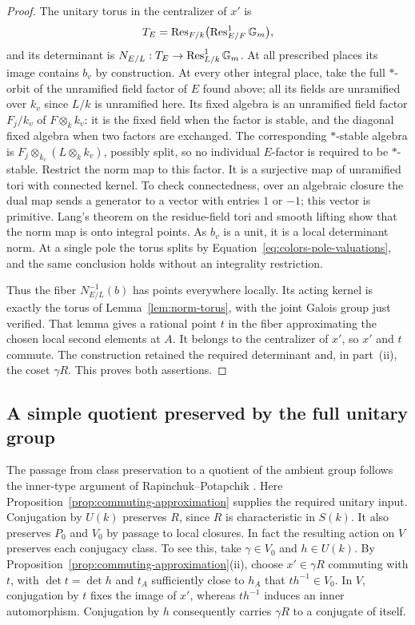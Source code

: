 \begin{proof}
The unitary torus in the centralizer of $x'$ is
\[
 T_E=\operatorname{Res}_{F/k}\bigl(\operatorname{Res}^1_{E/F}\mathbb G_m\bigr),
\]
and its determinant is $N_{E/L}:T_E\to\operatorname{Res}^1_{L/k}\mathbb G_m$.
At all prescribed places its image contains $b_v$ by construction.
At every other integral place, take the full $*$-orbit of the unramified
field factor of $E$ found above; all its fields are unramified over $k_v$
since $L/k$ is unramified here.  Its fixed algebra is an unramified field
factor $F_j/k_v$ of $F\otimes_k k_v$: it is the fixed field when the
factor is stable, and the diagonal fixed algebra when two factors are
exchanged.  The corresponding $*$-stable algebra is
$F_j\otimes_{k_v}(L\otimes_k k_v)$, possibly split, so no individual
$E$-factor is required to be $*$-stable.  Restrict the norm
map to this factor.  It is a surjective map of unramified tori with
connected kernel.  To check connectedness, over an algebraic closure
the dual map sends a generator to a vector with entries $1$ or $-1$;
this vector is primitive.  Lang's theorem on the residue-field tori and
smooth lifting show that the norm map is onto integral points.  As $b_v$
is a unit, it is a local determinant norm.  At a single pole the torus
splits by Equation~\eqref{eq:colors-pole-valuations}, and the same
conclusion holds without an integrality restriction.

Thus the fiber $N_{E/L}^{-1}(b)$ has points everywhere locally.  Its
acting kernel is exactly the torus of Lemma~\ref{lem:norm-torus}, with
the joint Galois group just verified.  That lemma gives a rational point
$t$ in the fiber approximating the chosen local second elements at $A$.
It belongs to the centralizer of $x'$, so $x'$ and $t$ commute.  The
construction retained the required determinant and, in part~\textup{(ii)},
the coset $\gamma R$.  This proves both assertions.
\end{proof}

\subsection{A simple quotient preserved by the full unitary group}

The passage from class preservation to a quotient of the ambient group
follows the inner-type argument of Rapinchuk--Potapchik
\cite[Corollary~2.3 and Theorem~2.4]{RapinchukPotapchik1996}.
Here Proposition~\ref{prop:commuting-approximation} supplies the required
unitary input. Conjugation by $U(k)$ preserves $R$, since $R$ is
characteristic in $S(k)$.  It also preserves $P_0$ and $V_0$ by passage to local closures.
In fact the resulting action on $V$ preserves each conjugacy class.
To see this, take $\gamma\in V_0$ and $h\in U(k)$.  By
Proposition~\ref{prop:commuting-approximation}\textup{(ii)}, choose
$x'\in\gamma R$ commuting with $t$, with $\det t=\det h$ and $t_A$
sufficiently close to $h_A$ that $t h^{-1}\in V_0$.  In $V$, conjugation
by $t$ fixes the image of $x'$, whereas $t h^{-1}$ induces an inner
automorphism.  Conjugation by $h$ consequently carries $\gamma R$ to a
conjugate of itself.

